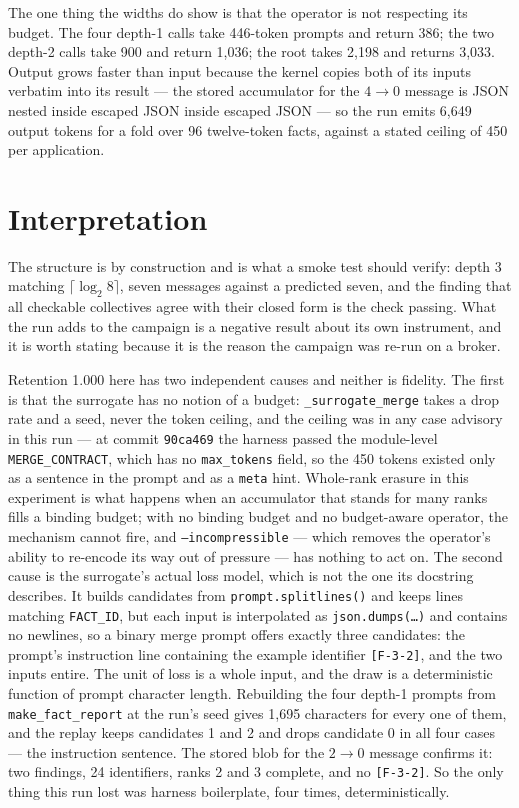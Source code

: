 \documentclass[11pt]{article}
\begin{document}
The one thing the widths do show is that the operator is not respecting its budget. The four
depth-1 calls take 446-token prompts and return 386; the two depth-2 calls take 900 and
return 1{,}036; the root takes 2{,}198 and returns 3{,}033. Output grows faster than input
because the kernel copies both of its inputs verbatim into its result --- the stored
accumulator for the $4\to0$ message is JSON nested inside escaped JSON inside escaped JSON
--- so the run emits 6{,}649 output tokens for a fold over 96 twelve-token facts, against a
stated ceiling of 450 per application.

\section{Interpretation}

The structure is by construction and is what a smoke test should verify: depth 3 matching
$\lceil\log_2 8\rceil$, seven messages against a predicted seven, and the finding that all
checkable collectives agree with their closed form is the check passing. What the run adds
to the campaign is a negative result about its own instrument, and it is worth stating
because it is the reason the campaign was re-run on a broker.

Retention 1.000 here has two independent causes and neither is fidelity. The first is that
the surrogate has no notion of a budget: \texttt{\_surrogate\_merge} takes a drop rate and a
seed, never the token ceiling, and the ceiling was in any case advisory in this run --- at
commit \texttt{90ca469} the harness passed the module-level \texttt{MERGE\_CONTRACT}, which
has no \texttt{max\_tokens} field, so the 450 tokens existed only as a sentence in the
prompt and as a \texttt{meta} hint. Whole-rank erasure in this experiment is what happens
when an accumulator that stands for many ranks fills a binding budget; with no binding
budget and no budget-aware operator, the mechanism cannot fire, and \texttt{--incompressible}
--- which removes the operator's ability to re-encode its way out of pressure --- has nothing
to act on. The second cause is the surrogate's actual loss model, which is not the one its
docstring describes. It builds candidates from \texttt{prompt.splitlines()} and keeps lines
matching \texttt{FACT\_ID}, but each input is interpolated as \texttt{json.dumps(\dots)} and
contains no newlines, so a binary merge prompt offers exactly three candidates: the prompt's
instruction line containing the example identifier \texttt{[F-3-2]}, and the two inputs
entire. The unit of loss is a whole input, and the draw is a deterministic function of
prompt character length. Rebuilding the four depth-1 prompts from
\texttt{make\_fact\_report} at the run's seed gives 1{,}695 characters for every one of
them, and the replay keeps candidates 1 and 2 and drops candidate 0 in all four cases ---
the instruction sentence. The stored blob for the $2\to0$ message confirms it: two findings,
24 identifiers, ranks 2 and 3 complete, and no \texttt{[F-3-2]}. So the only thing this run
lost was harness boilerplate, four times, deterministically.
\end{document}
